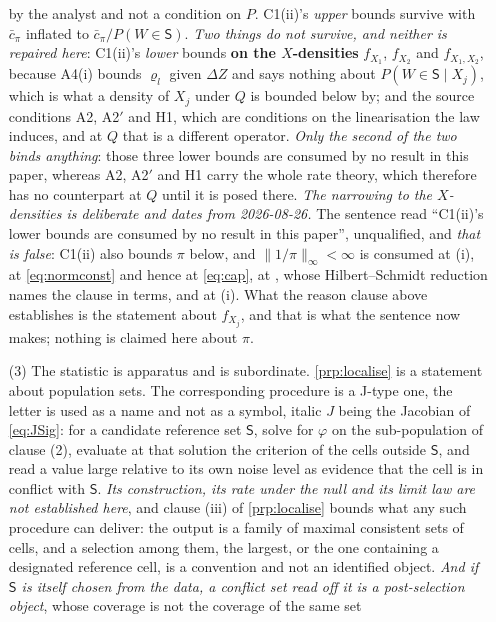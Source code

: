 \begin{remark}
\begin{enumerate}
by the analyst and not a condition on $P$. C1(ii)'s \emph{upper} bounds survive with $\bar c_\pi$
inflated to $\bar c_\pi/P(W\in\mathsf S)$. \emph{Two things do not survive, and neither is repaired
here}: C1(ii)'s \emph{lower} bounds \textbf{on the $X$-densities} $f_{X_1}$, $f_{X_2}$ and
$f_{X_1,X_2}$, because A4(i) bounds $\varrho_l$ given $\Delta Z$ and says nothing
about $P(W\in\mathsf S\mid X_j)$, which is what a density of $X_j$ under $Q$ is bounded below by; and the
source conditions A2, A2$'$ and H1, which are conditions on the linearisation the law induces, and at $Q$
that is a different operator. \emph{Only the second of the two binds anything}: those three lower bounds
are consumed by no result in this paper, whereas A2, A2$'$ and H1 carry the whole rate theory, which
therefore has no counterpart at $Q$ until it is posed there. \emph{The narrowing to the $X$-densities is
deliberate and dates from 2026-08-26.} The sentence read ``C1(ii)'s lower bounds are consumed by no
result in this paper'', unqualified, and \emph{that is false}: C1(ii) also bounds $\pi$ below, and
$\|1/\pi\|_\infty<\infty$ is consumed at \textup{(i)}, at
\eqref{eq:normconst} and hence at \eqref{eq:cap}, at , whose Hilbert--Schmidt
reduction names the clause in terms, and at \textup{(i)}. What the reason clause
above establishes is the statement about $f_{X_j}$, and that is what the sentence now makes; nothing is
claimed here about $\pi$.
\item[(3)] The statistic is apparatus and is subordinate. \cref{prp:localise} is a statement about
population sets. The corresponding procedure is a J-type one, the letter is used as a name and not as
a symbol, italic $J$ being the Jacobian of \eqref{eq:JSig}: for a candidate reference set
$\mathsf S$, solve for $\varphi$ on the sub-population of clause \textup{(2)}, evaluate at that solution
the criterion of the cells outside $\mathsf S$, and read a value large relative to its own noise level as
evidence that the cell is in conflict with $\mathsf S$. \emph{Its construction, its rate under the null
and its limit law are not established here}, and clause \textup{(iii)} of \cref{prp:localise} bounds what
any such procedure can deliver: the output is a family of maximal consistent sets of cells, and a
selection among them, the largest, or the one containing a designated reference cell, is a
convention and not an identified object. \emph{And if $\mathsf S$ is itself chosen from the data, a
conflict set read off it is a post-selection object}, whose coverage is not the coverage of the same set

\end{enumerate}
\end{remark}

